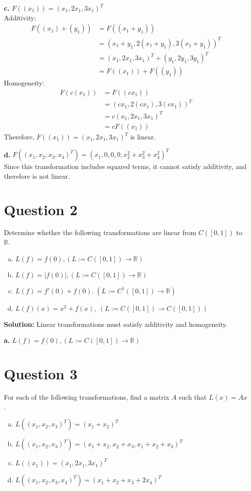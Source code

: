 \documentclass{article}
\begin{document}
\vspace{0.25cm}
\noindent\textbf{c.} $ F((x_1)) = (x_1, 2x_1, 3x_1)^T $ \\
Additivity:
\begin{align*}
    F((x_1) + (y_1)) &= F((x_1 + y_1)) \\
    &= (x_1 + y_1, 2(x_1 + y_1), 3(x_1 + y_1))^T \\
    &= (x_1, 2x_1, 3x_1)^T + (y_1, 2y_1, 3y_1)^T \\
    &= F((x_1)) + F((y_1))
\end{align*}
Homogeneity:
\begin{align*}
    F(c(x_1)) &= F((cx_1)) \\
    &= (cx_1, 2(cx_1), 3(cx_1))^T \\
    &= c(x_1, 2x_1, 3x_1)^T \\
    &= cF((x_1))
\end{align*}
Therefore, $F((x_1)) = (x_1, 2x_1, 3x_1)^T$ is linear.

\vspace{0.25cm}
\noindent\textbf{d.} $ F((x_1, x_2, x_3, x_4)^T) = (x_1, 0, 0, 0, x_2^2 + x_3^2 + x_4^2)^T $\\
Since this transformation includes squared terms, it cannot satisfy additivity, and therefore is not linear.

\section*{Question 2}
Determine whether the following transformations are linear from $C([0,1])$ to $\mathbb{R}$.
\begin{enumerate}[a.]
    \item $ L(f) = f(0), (L := C([0,1]) \to \mathbb{R}) $
    \item $ L(f) = |f(0)|, (L := C([0,1]) \to \mathbb{R}) $
    \item $ L(f) = f'(0) + f(0). \; (L := C^1([0,1]) \to \mathbb{R}) $
    \item $ L(f)(x) = x^2 + f(x), \; (L := C([0,1]) \to C([0,1])) $
\end{enumerate}

\noindent\textbf{Solution:} Linear transformations must satisfy additivity and homogeneity.

\vspace{0.25cm}
\noindent\textbf{a.} $ L(f) = f(0), (L := C([0,1]) \to \mathbb{R}) $ \\

\section*{Question 3}
For each of the following transformations, find a matrix $A$ such that $L(x) = Ax$.
\begin{enumerate}[a.]
    \item $ L((x_1, x_2, x_3)^T) = (x_1 + x_2)^T $
    \item $ L((x_1, x_2, x_3)^T) = (x_1 + x_2, x_2 + x_3, x_1 + x_2 + x_3)^T $
    \item $ L((x_1)) = (x_1, 2x_1, 3x_1)^T $
    \item $ L((x_1, x_2, x_3, x_4)^T) = (x_1 + x_2 + x_3 + 2x_4)^T $
\end{enumerate}
\end{document}
